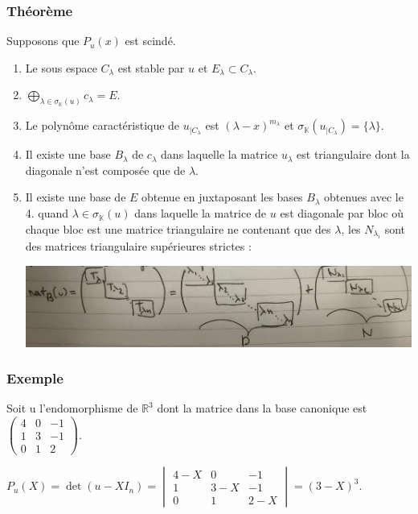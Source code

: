 \documentclass[a4paper,10pt]{book} %
\newcommand{\R}{\mathbb{R}}
\newcommand{\K}{\mathbb{K}}
\begin{document}
\subsubsection{Théorème}
Supposons que $P_u(x)$ est scindé.
\begin{enumerate}
\item Le sous espace $C_\lambda$ est stable par $u$ et $E_\lambda \subset C_\lambda$.

\item $\bigoplus_{\lambda\in \sigma_{\K}(u)}c_\lambda = E$.

\item Le polynôme caractéristique de $u_{|C_\lambda}$ est $(\lambda-x)^{m_\lambda}$ et $\sigma_{\K}(u_{|C_\lambda})=\{\lambda \}$.

\item Il existe une base $B_\lambda$ de $c_\lambda$ dans laquelle la matrice $u_\lambda$ est triangulaire dont la diagonale n'est composée que de $\lambda$.

\item Il existe une base de $E$ obtenue en juxtaposant les bases $B_\lambda$ obtenues avec le 4. quand $\lambda\in \sigma_\K(u)$ dans laquelle la matrice de $u$ est diagonale par bloc où chaque bloc est une matrice triangulaire ne contenant que des $\lambda$, les $N_{\lambda_i}$ sont des matrices triangulaire supérieures strictes :

\includegraphics[scale=0.2]{images/001.jpg}\label{maxime}

\end{enumerate}

\subsubsection{Exemple}
Soit u l'endomorphisme de $\R^3$ dont la matrice dans la base canonique est $\begin{pmatrix}
4&0&-1\\1&3&-1\\0&1&2
\end{pmatrix}$.

$P_u(X)=\det(u-X I_n)=\begin{vmatrix}
4-X&0&-1\\1&3-X&-1\\0&1&2-X
\end{vmatrix}=(3-X)^3$.
\end{document}

